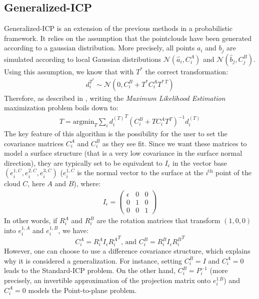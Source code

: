 \documentclass[11pt,letterpaper,leqno]{article}
\begin{document}
\subsection{Generalized-ICP} \label{seq:gen-icp}

Generalized-ICP is an extension of the previous methods in a probabilistic framework. It relies on the assumption that the pointclouds have been generated according to a gaussian distribution. More precisely, all points $a_i$ and $b_j$ are simulated according to local Gaussian distributions $\mathcal{N}(\hat{a}_i, C_i^A)$ and $\mathcal{N}(\hat{b}_j, C_j^B)$. Using this assumption, we know that with $T^*$ the correct transformation:
\begin{align*}
    d_i^{T^*} \sim \mathcal{N}\left(0, C_i^B + T^* C_i^AT^{*\,T}\right)
\end{align*}
Therefore, as described in \cite{generalized-icp}, writing the \textit{Maximum Likelihood Estimation} maximization problem boils down to:
\begin{align*}
    T = \text{argmin}_{T} \sum_i {d_i^{(T)}}^T (C_i^B + T C_i^A T^T)^{-1} d_i^{(T)}
\end{align*}
The key feature of this algorithm is the possibility for the user to set the covariance matrices $C_i^A$ and $C_i^B$ as they see fit. Since we want these matrices to model a surface structure (that is a very low covariance in the surface normal direction), they are typically set to be equivalent to $I_\epsilon$ in the vector base $(e^{1, C}_i, e^{2,C}_i, e^{3,C}_i)$ ($e^{1, C}_i$ is the normal vector to the surface at the $i^{\text{th}}$ point of the cloud $C$, here $A$ and $B$), where:
\begin{align*}
    I_\epsilon = 
    \begin{pmatrix}
        \epsilon & 0 & 0\\0 &1&0\\0&0&1
    \end{pmatrix}
\end{align*}
In other words, if $R_i^A$ and $R_i^B$ are the rotation matrices that transform $(1,0,0)$ into $e_i^{1,A}$ and $e_i^{1,B}$, we have:
$$
C_i^A = R_i^A I_\epsilon {R_i^{A}}^T \text{, and } C_i^B = R_i^B I_\epsilon {R_i^{B}}^{T}
$$
However, one can choose to use a difference covariance structure, which explains why it is considered a generalization. For instance, setting $C_i^B = I$ and $C_i^A = 0$ leads to the Standard-ICP problem. On the other hand, $C_i^B = P_i^{-1}$ (more precisely, an invertible approximation of the projection matrix onto $e_i^{1\,B}$) and $C_i^A = 0$ models the Point-to-plane problem.
\end{document}
